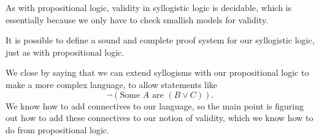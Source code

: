 \begin{remark}
	As with propositional logic, validity in syllogistic logic is decidable, which is essentially because we only have to check smallish models for validity.
\end{remark}
\begin{remark}
	It is possible to define a sound and complete proof system for our syllogistic logic, just as with propositional logic.
\end{remark}
We close by saying that we can extend syllogisms with our propositional logic to make a more complex language, to allow statements like
\[\lnot(\textrm{Some }A\text{ are }(B\lor C)).\]
We know how to add connectives to our language, so the main point is figuring out how to add these connectives to our notion of validity, which we know how to do from propositional logic.